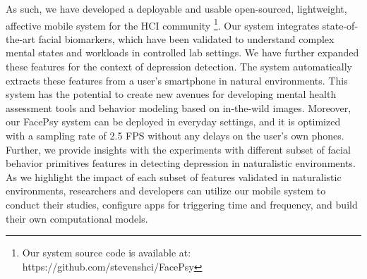 As such, we have developed a deployable and usable open-sourced, lightweight, affective mobile system for the HCI community \footnote{{Our system source code is available at: https://github.com/stevenshci/FacePsy}}. Our system integrates state-of-the-art facial biomarkers, which have been validated to understand complex mental states and workloads in controlled lab settings. We have further expanded these features for the context of depression detection. The system automatically extracts these features from a user's smartphone in natural environments. This system has the potential to create new avenues for developing mental health assessment tools and behavior modeling based on in-the-wild images. Moreover, our FacePsy system can be deployed in everyday settings, and it is optimized with a sampling rate of 2.5 FPS without any delays on the user's own phones. Further, we provide insights with the experiments with different subset of facial behavior primitives features in detecting depression in naturalistic environments. As we highlight the impact of each subset of features validated in naturalistic environments, researchers and developers can utilize our mobile system to conduct their studies, configure apps for triggering time and frequency, and build their own computational models.

